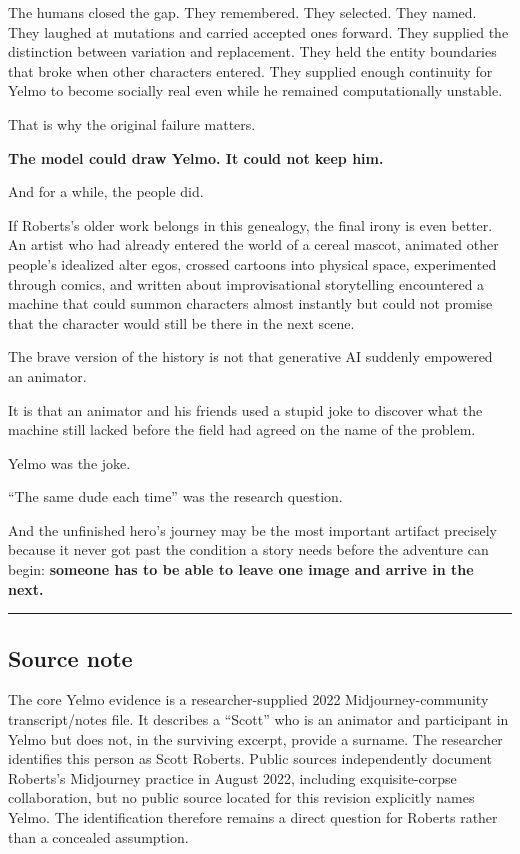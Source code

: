 \documentclass[
]{article}
\begin{document}
The humans closed the gap. They remembered. They selected. They named.
They laughed at mutations and carried accepted ones forward. They
supplied the distinction between variation and replacement. They held
the entity boundaries that broke when other characters entered. They
supplied enough continuity for Yelmo to become socially real even while
he remained computationally unstable.

That is why the original failure matters.

\textbf{The model could draw Yelmo. It could not keep him.}

And for a while, the people did.

If Roberts's older work belongs in this genealogy, the final irony is
even better. An artist who had already entered the world of a cereal
mascot, animated other people's idealized alter egos, crossed cartoons
into physical space, experimented through comics, and written about
improvisational storytelling encountered a machine that could summon
characters almost instantly but could not promise that the character
would still be there in the next scene.

The brave version of the history is not that generative AI suddenly
empowered an animator.

It is that an animator and his friends used a stupid joke to discover
what the machine still lacked before the field had agreed on the name of
the problem.

Yelmo was the joke.

``The same dude each time'' was the research question.

And the unfinished hero's journey may be the most important artifact
precisely because it never got past the condition a story needs before
the adventure can begin: \textbf{someone has to be able to leave one
image and arrive in the next.}

\begin{center}\rule{0.5\linewidth}{0.5pt}\end{center}

\subsection{Source note}\label{source-note}

The core Yelmo evidence is a researcher-supplied 2022
Midjourney-community transcript/notes file. It describes a ``Scott'' who
is an animator and participant in Yelmo but does not, in the surviving
excerpt, provide a surname. The researcher identifies this person as
Scott Roberts. Public sources independently document Roberts's
Midjourney practice in August 2022, including exquisite-corpse
collaboration, but no public source located for this revision explicitly
names Yelmo. The identification therefore remains a direct question for
Roberts rather than a concealed assumption.
\end{document}
